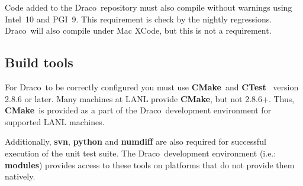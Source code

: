 \documentclass[11pt]{nmemo}
\newcommand{\comp}[1]{\normalfont\footnotesize\texttt{#1}\normalsize}
\newcommand{\draco}{{\normalfont\sffamily Draco}}
\newcommand{\cmake}{{\normalfont\bfseries CMake}}
\newcommand{\ctest}{{\normalfont\bfseries CTest}}
\begin{document}
Code added to the \draco\ repository must also compile without
warnings using Intel~10 and PGI~9.  This requirement is check by the
nightly regressions.  \draco\ will also compile under Mac XCode, but
this is not a requirement.

\subsection{Build tools}

For \draco\ to be correctly configured you must use \cmake\ and
\ctest~\cite{cmake} version 2.8.6 or later.  Many machines at LANL
provide \cmake, but not 2.8.6+.  Thus, \cmake\ is provided as a part
of the \draco\ development environment for supported LANL machines.

Additionally, \textbf{svn}, \textbf{python} and \textbf{numdiff} are
also required for successful execution of the unit test suite. The
\draco\ development environment (i.e.: \textbf{modules}) provides
access to these tools on platforms that do not provide them natively.





%
\end{document}
